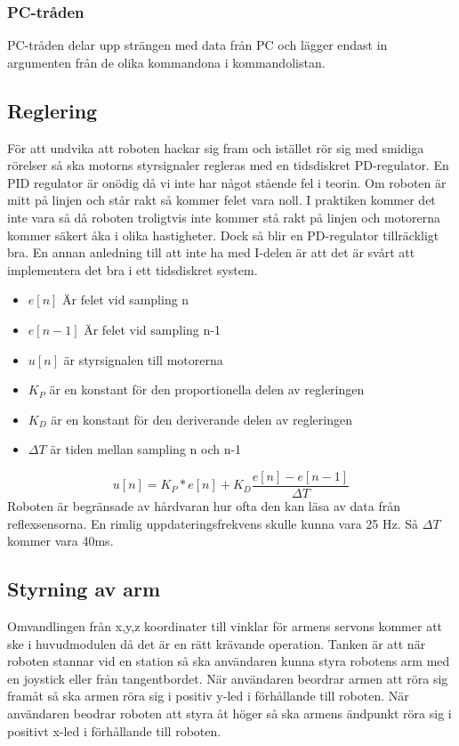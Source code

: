 \subsubsection{PC-tråden}
PC-tråden delar upp strängen med data från PC och lägger endast in argumenten från de olika kommandona i kommandolistan.

\subsection{Reglering}
För att undvika att roboten hackar sig fram och istället rör sig med smidiga rörelser så ska motorns styrsignaler regleras med en tidsdiskret PD-regulator. En PID regulator är onödig då vi inte har något stående fel i teorin. Om roboten är mitt på linjen och står rakt så kommer felet vara noll. I praktiken kommer det inte vara så då roboten troligtvis inte kommer stå rakt på linjen och motorerna kommer säkert åka i olika hastigheter. Dock så blir en PD-regulator tillräckligt bra. En annan anledning till att inte ha med I-delen är att det är svårt att implementera det bra i ett tidsdiskret system. 
\begin{itemize}
\item $e[n]$ Är felet vid sampling n
\item $e[n-1]$ Är felet vid sampling n-1
\item $u[n]$ är styrsignalen till motorerna
\item $K_{P}$ är en konstant för den proportionella delen av regleringen
\item $K_{D}$ är en konstant för den deriverande delen av regleringen
\item $\Delta T$ är tiden mellan sampling n och n-1
 
\end{itemize}
 $$ u[n] = K_P*e[n] + K_D\frac{e[n]-e[n-1]}{\Delta T}$$
 Roboten är begränsade av hårdvaran hur ofta den kan läsa av data från reflexsensorna. En rimlig uppdateringsfrekvens skulle kunna vara 25 Hz\cite{handledare}. Så $\Delta T$ kommer vara 40ms.

 \subsection{Styrning av arm}
 Omvandlingen från x,y,z koordinater till vinklar för armens servons kommer att ske i huvudmodulen då det är en rätt krävande operation. Tanken är att när roboten stannar vid en station så ska användaren kunna styra robotens arm med en joystick eller från tangentbordet. När användaren beordrar armen att röra sig framåt så ska armen röra sig i positiv y-led i förhållande till roboten. När användaren beodrar roboten att styra åt höger så ska armens ändpunkt röra sig i positivt x-led i förhållande till roboten.
 \newline

